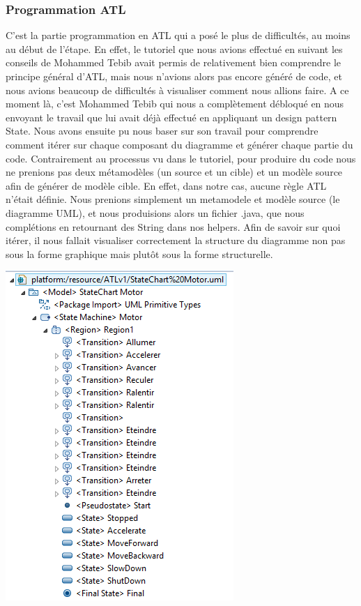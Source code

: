 \documentclass[french, 12pt, a4paper]{article}
\begin{document}
    \subsubsection{Programmation ATL}
    C'est la partie programmation en ATL qui a posé le plus de difficultés, au moins au début de l'étape. En effet, le tutoriel que nous avions effectué en suivant les conseils de Mohammed Tebib avait permis de relativement bien comprendre le principe général d'ATL, mais nous n'avions alors pas encore généré de code, et nous avions beaucoup de difficultés à visualiser comment nous allions faire. 
    A ce moment là, c'est Mohammed Tebib qui nous a complètement débloqué en nous envoyant le travail que lui avait déjà effectué en appliquant un design pattern State. Nous avons ensuite pu nous baser sur son travail pour comprendre comment itérer sur chaque composant du diagramme et générer chaque partie du code. 
    Contrairement au processus vu dans le tutoriel, pour produire du code nous ne prenions pas deux métamodèles (un source et un cible) et un modèle source afin de générer de modèle cible. En effet, dans notre cas, aucune règle ATL n'était définie. Nous prenions simplement un metamodele et modèle source (le diagramme UML), et nous produisions alors un fichier .java, que nous complétions en retournant des String dans nos helpers. 
    \newline
    Afin de savoir sur quoi itérer, il nous fallait visualiser correctement la structure du diagramme non pas sous la forme graphique mais plutôt sous la forme structurelle.
    
	\begin{center}
			\captionsetup{type=figure}
			\includegraphics[scale=0.7]{Images/structureV1.png}
	\end{center}
	
\end{document}
